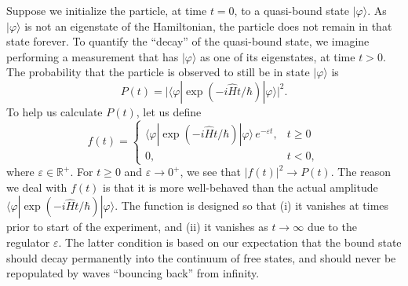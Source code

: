 \documentclass[pra,12pt]{revtex4-2}
\begin{document}
Suppose we initialize the particle, at time $t = 0$, to a quasi-bound
state $|\varphi\rangle$.  As $|\varphi\rangle$ is not an eigenstate of
the Hamiltonian, the particle does not remain in that state forever.
To quantify the ``decay'' of the quasi-bound state, we imagine
performing a measurement that has $|\varphi\rangle$ as one of its
eigenstates, at time $t > 0$.  The probability that the particle is
observed to still be in state $|\varphi\rangle$ is
\begin{equation}
  P(t) = \Big|\langle\varphi|\exp\left(-i\hat{H}t/\hbar\right)|\varphi\rangle\Big|^2.
\end{equation}
To help us calculate $P(t)$, let us define
\begin{equation}
  f(t) = \begin{cases} \langle\varphi|\exp\left(-i\hat{H}t/\hbar\right)|\varphi\rangle \,e^{-\varepsilon t}, & t \ge 0 \\ 0, & t < 0,\end{cases}
  \label{fregulated}
\end{equation}
where $\varepsilon \in \mathbb{R}^+$.  For $t \ge 0$ and $\varepsilon
\rightarrow 0^+$, we see that $|f(t)|^2 \rightarrow P(t)$.  The reason
we deal with $f(t)$ is that it is more well-behaved than the actual
amplitude $\langle\varphi|\exp(-i\hat{H}t/\hbar)|\varphi\rangle$.  The
function is designed so that (i) it vanishes at times prior to start
of the experiment, and (ii) it vanishes as $t\rightarrow\infty$ due to
the regulator $\varepsilon$.  The latter condition is based on our
expectation that the bound state should decay permanently into the
continuum of free states, and should never be repopulated by waves
``bouncing back'' from infinity.
\end{document}
